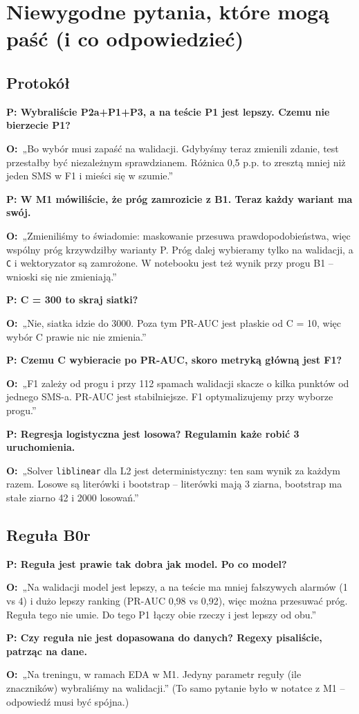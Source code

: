 \documentclass[11pt,a4paper]{article}
\newcommand{\pyt}[1]{\par\medskip\textbf{\color{spam}P: #1}\par}
\newcommand{\odp}{\textbf{O:}~}
\begin{document}
\section{Niewygodne pytania, które mogą paść (i co odpowiedzieć)}

\subsection{Protokół}

\pyt{Wybraliście P2a+P1+P3, a na teście P1 jest lepszy. Czemu nie bierzecie P1?}
\odp „Bo wybór musi zapaść na walidacji. Gdybyśmy teraz zmienili zdanie, test przestałby być niezależnym sprawdzianem.
Różnica 0,5 p.p. to zresztą mniej niż jeden SMS w F1 i mieści się w szumie.”

\pyt{W M1 mówiliście, że próg zamrozicie z B1. Teraz każdy wariant ma swój.}
\odp „Zmieniliśmy to świadomie: maskowanie przesuwa prawdopodobieństwa, więc wspólny próg krzywdziłby warianty P.
Próg dalej wybieramy tylko na walidacji, a \texttt{C} i wektoryzator są zamrożone. W notebooku jest też wynik przy progu
B1 -- wnioski się nie zmieniają.”

\pyt{C = 300 to skraj siatki?}
\odp „Nie, siatka idzie do 3000. Poza tym PR-AUC jest płaskie od C = 10, więc wybór C prawie nic nie zmienia.”

\pyt{Czemu C wybieracie po PR-AUC, skoro metryką główną jest F1?}
\odp „F1 zależy od progu i przy 112 spamach walidacji skacze o kilka punktów od jednego SMS-a. PR-AUC jest stabilniejsze.
F1 optymalizujemy przy wyborze progu.”

\pyt{Regresja logistyczna jest losowa? Regulamin każe robić 3 uruchomienia.}
\odp „Solver \texttt{liblinear} dla L2 jest deterministyczny: ten sam wynik za każdym razem. Losowe są literówki i bootstrap --
literówki mają 3 ziarna, bootstrap ma stałe ziarno 42 i 2000 losowań.”

\subsection{Reguła B0r}

\pyt{Reguła jest prawie tak dobra jak model. Po co model?}
\odp „Na walidacji model jest lepszy, a na teście ma mniej fałszywych alarmów (1 vs 4) i dużo lepszy ranking (PR-AUC 0,98 vs 0,92),
więc można przesuwać próg. Reguła tego nie umie. Do tego P1 łączy obie rzeczy i jest lepszy od obu.”

\pyt{Czy reguła nie jest dopasowana do danych? Regexy pisaliście, patrząc na dane.}
\odp „Na treningu, w ramach EDA w M1. Jedyny parametr reguły (ile znaczników) wybraliśmy na walidacji.”
(To samo pytanie było w notatce z M1 -- odpowiedź musi być spójna.)
\end{document}
